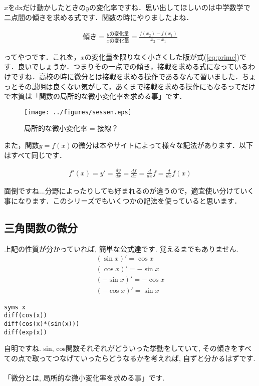 \documentclass[11pt,a4paper]{ujreport}
\begin{document}
$x$をdxだけ動かしたときの$y$の変化率ですね．思い出してほしいのは中学数学で二点間の傾きを求める式です．関数の時にやりましたよね．

\begin{eqnarray}
\text{傾き} = \frac{y\text{の変化量}}{x\text{の変化量}} = \frac{f(x_2) - f(x_1)}{x_2 - x_1}
\end{eqnarray}

ってやつです．これを，$x$の変化量を限りなく小さくした版が式(\ref{eq:prime})です．良いでしょうか．つまりその一点での傾き，接戦を求める式になっているわけですね．高校の時に微分とは接戦を求める操作であるなんて習いました．ちょっとその説明は良くない気がして，あくまで接戦を求める操作にもなるってだけで本質は「関数の局所的な微小変化率を求める事」です．\\

\begin{figure}[H]
\label{im:sessen}
  \centering
  \texttt{[image: ../figures/sessen.eps]}
  \caption{局所的な微小変化率 = 接線？}
\end{figure}

また，関数$y=f(x)$の微分は本やサイトによって様々な記法があります．以下はすべて同じです．

\begin{eqnarray}
f'(x) = y' = \frac{dy}{dx} = \frac{df}{dx} = \frac{d}{dx}f = \frac{d}{dx}f(x)\nonumber
\end{eqnarray}

面倒ですね...分野によったりしても好まれるのが違うので，適宜使い分けていく事になります．このシリーズでもいくつかの記法を使っていると思います．
\subsection{三角関数の微分}
上記の性質が分かっていれば, 簡単な公式達です. 覚えるまでもありません.
\begin{eqnarray}
(\sin x)' = \cos x \\
(\cos x)' = -\sin x \\
(-\sin x)' = -\cos x \\
(-\cos x)' = \sin x
\end{eqnarray}

\begin{lstlisting}[caption=いろんな微分,label=sc:diff]
syms x
diff(cos(x))
diff(cos(x)*(sin(x)))
diff(exp(x))
\end{lstlisting}

自明ですね. sin, cos関数それぞれがどういった挙動をしていて, その傾きをすべての点で取ってつなげていったらどうなるかを考えれば, 自ずと分かるはずです.\\
\\
「微分とは, 局所的な微小変化率を求める事」です.\\
\end{document}
